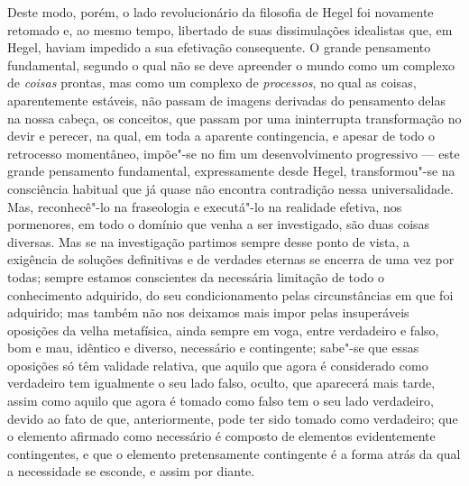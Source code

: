 Deste modo, porém, o lado revolucionário da filosofia
de Hegel foi
novamente retomado e, ao mesmo tempo, libertado de suas dissimulações
idealistas que,
em Hegel,
haviam impedido a sua efetivação consequente. O grande pensamento
fundamental, segundo o qual não se deve apreender o mundo como um
complexo de \emph{coisas }prontas, mas como um complexo
de \emph{processos}, no qual as coisas, aparentemente estáveis, não
passam de imagens derivadas do pensamento delas na nossa cabeça, os
conceitos, que passam por uma ininterrupta transformação no devir e perecer,
na qual, em toda a aparente contingencia, e apesar de todo o retrocesso
momentâneo, impõe"-se no fim um desenvolvimento progressivo --- este grande
pensamento fundamental, expressamente
desde Hegel,
transformou"-se na consciência habitual que já quase não encontra
contradição nessa universalidade. Mas, reconhecê"-lo na fraseologia e
executá"-lo na realidade efetiva, nos pormenores, em todo o domínio que
venha a ser investigado, são duas coisas diversas. Mas se na
investigação partimos sempre desse ponto de vista,
 a exigência de soluções definitivas e de
verdades eternas se encerra de uma vez por todas; sempre estamos
conscientes da necessária limitação de todo o conhecimento adquirido, do
seu condicionamento pelas circunstâncias em que foi adquirido; mas
também não nos deixamos mais impor pelas insuperáveis oposições da velha %
metafísica, ainda sempre em voga, entre verdadeiro e falso, bom e mau,
idêntico e diverso, necessário e contingente; sabe"-se que essas
oposições só têm validade relativa, que aquilo que agora é considerado
como verdadeiro tem igualmente o seu lado falso, oculto, que aparecerá
mais tarde, assim como aquilo que agora é tomado como falso tem o seu
lado verdadeiro, devido ao fato de que, anteriormente, pode ter sido
tomado como verdadeiro; que o elemento afirmado como necessário é
composto de elementos evidentemente contingentes, e que o elemento
pretensamente contingente é a forma atrás da qual a necessidade se
esconde, e assim por diante.

